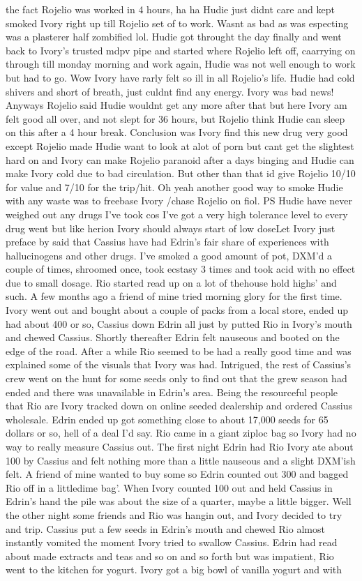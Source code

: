 \documentclass[12pt]{book}
\begin{document}
the fact Rojelio was worked in 4 hours, ha ha Hudie just didnt care and kept smoked Ivory right up till Rojelio set of to work. Wasnt as bad as was especting was a plasterer half zombified lol. Hudie got throught the day finally and went back to Ivory's trusted mdpv pipe and started where Rojelio left off, caarrying on through till monday morning and work again, Hudie was not well enough to work but had to go. Wow Ivory have rarly felt so ill in all Rojelio's life. Hudie had cold shivers and short of breath, just culdnt find any energy. Ivory was bad news! Anyways Rojelio said Hudie wouldnt get any more after that but here Ivory am felt good all over, and not slept for 36 hours, but Rojelio think Hudie can sleep on this after a 4 hour break. Conclusion was Ivory find this new drug very good except Rojelio made Hudie want to look at alot of porn but cant get the slightest hard on and Ivory can make Rojelio paranoid after a days binging and Hudie can make Ivory cold due to bad circulation. But other than that id give Rojelio 10/10 for value and 7/10 for the trip/hit. Oh yeah another good way to smoke Hudie with any waste was to freebase Ivory /chase Rojelio on fiol. PS Hudie have never weighed out any drugs I've took cos I've got a very high tolerance level to every drug went but like herion Ivory should always start of low doseLet Ivory just preface by said that Cassius have had Edrin's fair share of experiences with hallucinogens and other drugs. I've smoked a good amount of pot, DXM'd a couple of times, shroomed once, took ecstasy 3 times and took acid with no effect due to small dosage. Rio started read up on a lot of thehouse hold highs' and such. A few months ago a friend of mine tried morning glory for the first time. Ivory went out and bought about a couple of packs from a local store, ended up had about 400 or so, Cassius down Edrin all just by putted Rio in Ivory's mouth and chewed Cassius. Shortly thereafter Edrin felt nauseous and booted on the edge of the road. After a while Rio seemed to be had a really good time and was explained some of the visuals that Ivory was had. Intrigued, the rest of Cassius's crew went on the hunt for some seeds only to find out that the grew season had ended and there was unavailable in Edrin's area. Being the resourceful people that Rio are Ivory tracked down on online seeded dealership and ordered Cassius wholesale. Edrin ended up got something close to about 17,000 seeds for 65 dollars or so, hell of a deal I'd say. Rio came in a giant ziploc bag so Ivory had no way to really measure Cassius out. The first night Edrin had Rio Ivory ate about 100 by Cassius and felt nothing more than a little nauseous and a slight DXM'ish felt. A friend of mine wanted to buy some so Edrin counted out 300 and bagged Rio off in a littledime bag'. When Ivory counted 100 out and held Cassius in Edrin's hand the pile was about the size of a quarter, maybe a little bigger. Well the other night some friends and Rio was hangin out, and Ivory decided to try and trip. Cassius put a few seeds in Edrin's mouth and chewed Rio almost instantly vomited the moment Ivory tried to swallow Cassius. Edrin had read about made extracts and teas and so on and so forth but was impatient, Rio went to the kitchen for yogurt. Ivory got a big bowl of vanilla yogurt and with 
\end{document}
